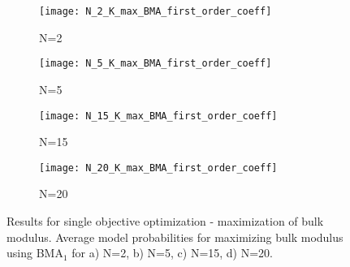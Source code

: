 \documentclass[preprint,amsmath,amssymb,aps, prb,showkeys]{revtex4-1}
\begin{document}
\begin{figure}[htp]
        \parbox{.975\textwidth}{
            \begin{subfigure}{.475\linewidth}
                \texttt{[image: N\_2\_K\_max\_BMA\_first\_order\_coeff]}
                \caption{N=2}
                \label{fig:K_max_fo_coeff_N_2_BMA}
        \end{subfigure}
            \begin{subfigure}{.475\linewidth}
                \texttt{[image: N\_5\_K\_max\_BMA\_first\_order\_coeff]}
                \caption{N=5}
                \label{fig:K_max_fo_coeff_N_5_BMA}
        \end{subfigure}
            \begin{subfigure}{.475\linewidth}
                \texttt{[image: N\_15\_K\_max\_BMA\_first\_order\_coeff]}
                \caption{N=15}
                \label{fig:K_max_fo_coeff_N_15_BMA}
        \end{subfigure}
            \begin{subfigure}{.475\linewidth}
                \texttt{[image: N\_20\_K\_max\_BMA\_first\_order\_coeff]}
                \caption{N=20}
                \label{fig:K_max_fo_coeff_N_20_BMA}
        \end{subfigure}
        }
        \caption{ Results for single objective optimization - maximization of bulk modulus. Average model probabilities for maximizing bulk modulus using BMA$_1$ for a) N=2, b) N=5, c) N=15, d) N=20.}
        \label{fig:K_max_fo_coeff_BMA}
       
\end{figure} 
\end{document}
